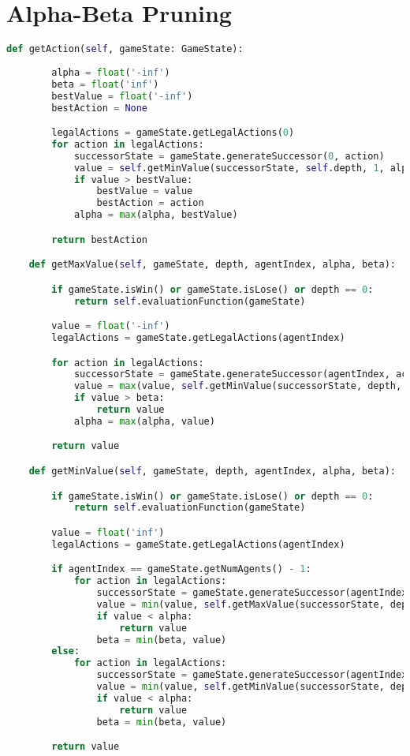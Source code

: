 \documentclass[12pt,a4paper]{article}
\begin{document}
\section{Alpha-Beta Pruning}
\begin{lstlisting}[language=Python]
    def getAction(self, gameState: GameState):
    
        alpha = float('-inf')
        beta = float('inf')
        bestValue = float('-inf')
        bestAction = None

        legalActions = gameState.getLegalActions(0)
        for action in legalActions:
            successorState = gameState.generateSuccessor(0, action)
            value = self.getMinValue(successorState, self.depth, 1, alpha, beta)
            if value > bestValue:
                bestValue = value
                bestAction = action
            alpha = max(alpha, bestValue)

        return bestAction

    def getMaxValue(self, gameState, depth, agentIndex, alpha, beta):

        if gameState.isWin() or gameState.isLose() or depth == 0:
            return self.evaluationFunction(gameState)

        value = float('-inf')
        legalActions = gameState.getLegalActions(agentIndex)

        for action in legalActions:
            successorState = gameState.generateSuccessor(agentIndex, action)
            value = max(value, self.getMinValue(successorState, depth, agentIndex + 1, alpha, beta))
            if value > beta:
                return value
            alpha = max(alpha, value)

        return value

    def getMinValue(self, gameState, depth, agentIndex, alpha, beta):

        if gameState.isWin() or gameState.isLose() or depth == 0:
            return self.evaluationFunction(gameState)

        value = float('inf')
        legalActions = gameState.getLegalActions(agentIndex)

        if agentIndex == gameState.getNumAgents() - 1:
            for action in legalActions:
                successorState = gameState.generateSuccessor(agentIndex, action)
                value = min(value, self.getMaxValue(successorState, depth - 1, 0, alpha, beta))
                if value < alpha:
                    return value
                beta = min(beta, value)
        else:
            for action in legalActions:
                successorState = gameState.generateSuccessor(agentIndex, action)
                value = min(value, self.getMinValue(successorState, depth, agentIndex + 1, alpha, beta))
                if value < alpha:
                    return value
                beta = min(beta, value)

        return value

\end{lstlisting}
\end{document}
